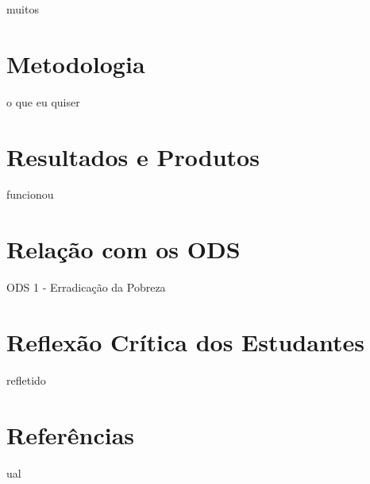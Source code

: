 \documentclass[12pt,a4paper]{article}
\begin{document}
muitos


\section*{Metodologia}

o que eu quiser


\section*{Resultados e Produtos}

funcionou


\section*{Relação com os ODS}

ODS 1 - Erradicação da Pobreza


\section*{Reflexão Crítica dos Estudantes}

refletido


\section*{Referências}

ual
\end{document}
